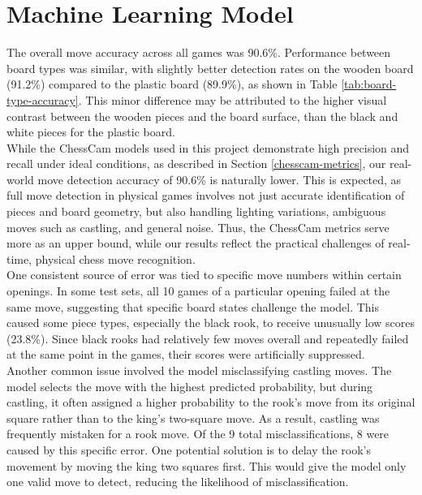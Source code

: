 \section{Machine Learning Model}

The overall move accuracy across all games was 90.6\%. Performance between board types was similar, with slightly better detection rates on the wooden board (91.2\%) compared to the plastic board (89.9\%), as shown in Table \ref{tab:board-type-accuracy}. This minor difference may be attributed to the higher visual contrast between the wooden pieces and the board surface, than the black and white pieces for the plastic board. \\

While the ChessCam models used in this project demonstrate high precision and recall under ideal conditions, as described in Section \ref{chesscam-metrics}, our real-world move detection accuracy of 90.6\% is naturally lower. This is expected, as full move detection in physical games involves not just accurate identification of pieces and board geometry, but also handling lighting variations, ambiguous moves such as \gls{castling}, and general noise. Thus, the ChessCam metrics serve more as an upper bound, while our results reflect the practical challenges of real-time, physical chess move recognition. \\

One consistent source of error was tied to specific move numbers within certain openings. In some test sets, all 10 games of a particular opening failed at the same move, suggesting that specific board states challenge the model. This caused some piece types, especially the black rook, to receive unusually low scores (23.8\%). Since black rooks had relatively few moves overall and repeatedly failed at the same point in the games, their scores were artificially suppressed. \\

Another common issue involved the model misclassifying castling moves. The model selects the move with the highest predicted probability, but during castling, it often assigned a higher probability to the rook’s move from its original square rather than to the king’s two-square move. As a result, castling was frequently mistaken for a rook move. Of the 9 total misclassifications, 8 were caused by this specific error. One potential solution is to delay the rook’s movement by moving the king two squares first. This would give the model only one valid move to detect, reducing the likelihood of misclassification. \\

